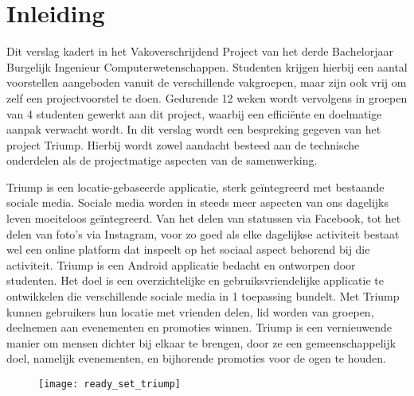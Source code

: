 \chapter{Inleiding}
Dit verslag kadert in het Vakoverschrijdend Project van het derde Bachelorjaar Burgelijk Ingenieur Computerwetenschappen. Studenten krijgen hierbij een aantal voorstellen aangeboden vanuit de verschillende vakgroepen, maar zijn ook vrij om zelf een projectvoorstel te doen. Gedurende 12 weken wordt vervolgens in groepen van 4 studenten gewerkt aan dit project, waarbij een efficiënte en doelmatige aanpak verwacht wordt. In dit verslag wordt een bespreking gegeven van het project Triump. Hierbij wordt zowel aandacht besteed aan de technische onderdelen als de projectmatige aspecten van de samenwerking.


Triump is een locatie-gebaseerde applicatie, sterk geïntegreerd met bestaande sociale media.
Sociale media worden in steeds meer aspecten van ons dagelijks leven moeiteloos geïntegreerd. Van het delen van statussen via Facebook, tot het delen van foto’s via Instagram, voor zo goed als elke dagelijkse activiteit bestaat wel een online platform dat inspeelt op het sociaal aspect behorend bij die activiteit.
Triump is een Android applicatie bedacht en ontworpen door studenten. Het doel is een overzichtelijke en gebruiksvriendelijke applicatie te ontwikkelen die verschillende sociale media in 1 toepassing bundelt. Met Triump kunnen gebruikers hun locatie met vrienden delen, lid worden van groepen, deelnemen aan evenementen en promoties winnen.
Triump is een vernieuwende manier om mensen dichter bij elkaar te brengen, door ze een gemeenschappelijk doel, namelijk evenementen, en bijhorende promoties voor de ogen te houden.


\begin{figure}[H]
	\centering
	\texttt{[image: ready\_set\_triump]}
	\label{fig:inleiding}
	
\end{figure}
